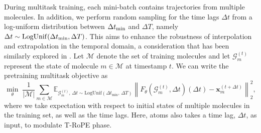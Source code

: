 During multitask training, each mini-batch contains trajectories from multiple molecules. 
In addition, we perform random sampling for the time lags $\Delta t$ from a log-uniform distribution between $\Delta t_{\rm min}$ and $\Delta T$, namely $\Delta t \sim {\rm LogUnif}(\Delta t_{\rm min}, \Delta T)$. This aims to enhance the robustness of interpolation and extrapolation in the temporal domain, a consideration that has been similarly explored in \citep{schreiner_implicit_2023}. Let $\mathcal{M}$ denote the set of training molecules and let $\mathcal{G}_m^{(t)}$ represent the state of molecule $m \in \mathcal{M}$ at timestamp $t$. We can write the pretraining multitask objective as 
\begin{equation*}
\min_{\theta}\;
\frac{1}{|\mathcal{M}|}\sum_{m\in\mathcal{M}}
\mathbb{E}_{\mathcal{G}^{(t)}_{m},\, \Delta t \sim \mathrm{LogUnif}(\Delta t_{\min},\, \Delta T)}
\left\|
F_\theta\!\left(\mathcal{G}^{(t)}_{m}, \Delta t\right)(\Delta t) - \mathbf{x}^{(t+\Delta t)}_{m}
\right\|_2^2,
\end{equation*}
where we take expectation with respect to initial states of multiple molecules in the training set, as well as the time lags. Here, \gls{atoms} also takes a time lag, $\Delta t$, as input, to modulate T-RoPE phase.










